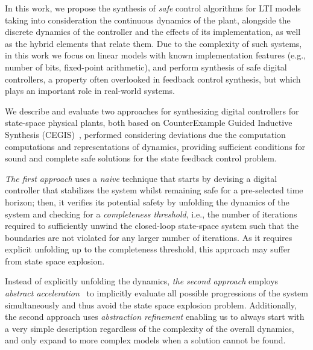 \documentclass[runningheads,a4paper]{llncs}
\begin{document}
In this work, we propose the synthesis of \emph{safe} control algorithms for
LTI models taking into consideration the continuous dynamics of the plant, 
alongside the discrete dynamics of the controller and the effects of its 
implementation, as well as the hybrid elements that relate them.  
Due to the complexity of such systems, in this work we focus 
on linear models with known  implementation features (e.g., number of bits, fixed-point
arithmetic), and perform synthesis of safe digital controllers, a property often 
overlooked in feedback control synthesis, but which plays an important role 
in real-world systems.

We describe and evaluate two approaches for synthesizing digital controllers
for state-space physical plants, both based on CounterExample
Guided Inductive Synthesis (CEGIS)~\cite{sketch}, performed considering deviations due the computation computations and representations of dynamics, providing sufficient conditions for sound and complete safe solutions for the state feedback control problem.

{\em The first approach} uses a {\em naive}
technique that starts by devising a digital controller that stabilizes the system
whilst remaining safe for a 
pre-selected time horizon; then, it verifies its potential safety by unfolding
the dynamics of the system and checking for a {\em completeness threshold}, i.e.,
the number of iterations required to sufficiently unwind
the closed-loop state-space system such
that the boundaries are not violated for any larger number of iterations.
As it requires explicit unfolding up to the completeness
threshold, this approach may suffer from state space explosion.

Instead of explicitly unfolding the dynamics, {\em the second approach} 
employs {\em abstract acceleration}~\cite{cattaruzza2015unbounded} to implicitly
evaluate all possible progressions of the system simultaneously and thus avoid
the state space explosion problem.
Additionally, the second approach uses
{\em abstraction refinement} enabling us to always start with a very simple description
regardless of the complexity of the overall dynamics, and only expand to more
complex models when a solution cannot be found.

\end{document}
